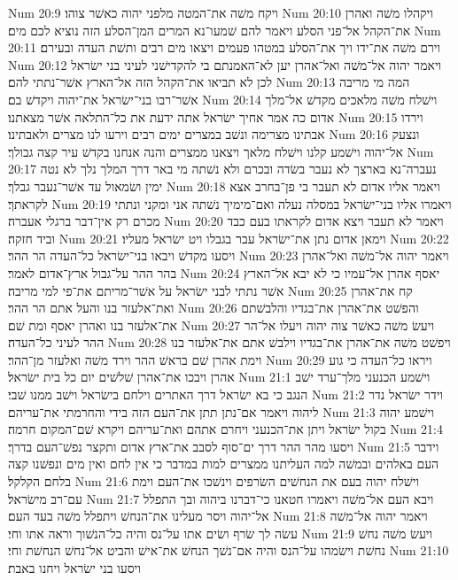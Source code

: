 Num 20:9  ויקח משׁה את־המטה מלפני יהוה כאשׁר צוהו׃
Num 20:10  ויקהלו משׁה ואהרן את־הקהל אל־פני הסלע ויאמר להם שׁמעו־נא המרים המן־הסלע הזה נוציא לכם מים׃
Num 20:11  וירם משׁה את־ידו ויך את־הסלע במטהו פעמים ויצאו מים רבים ותשׁת העדה ובעירם׃
Num 20:12  ויאמר יהוה אל־משׁה ואל־אהרן יען לא־האמנתם בי להקדישׁני לעיני בני ישׂראל לכן לא תביאו את־הקהל הזה אל־הארץ אשׁר־נתתי להם׃
Num 20:13  המה מי מריבה אשׁר־רבו בני־ישׂראל את־יהוה ויקדשׁ בם׃
Num 20:14  וישׁלח משׁה מלאכים מקדשׁ אל־מלך אדום כה אמר אחיך ישׂראל אתה ידעת את כל־התלאה אשׁר מצאתנו׃
Num 20:15  וירדו אבתינו מצרימה ונשׁב במצרים ימים רבים וירעו לנו מצרים ולאבתינו׃
Num 20:16  ונצעק אל־יהוה וישׁמע קלנו וישׁלח מלאך ויצאנו ממצרים והנה אנחנו בקדשׁ עיר קצה גבולך׃
Num 20:17  נעברה־נא בארצך לא נעבר בשׂדה ובכרם ולא נשׁתה מי באר דרך המלך נלך לא נטה ימין ושׂמאול עד אשׁר־נעבר גבלך׃
Num 20:18  ויאמר אליו אדום לא תעבר בי פן־בחרב אצא לקראתך׃
Num 20:19  ויאמרו אליו בני־ישׂראל במסלה נעלה ואם־מימיך נשׁתה אני ומקני ונתתי מכרם רק אין־דבר ברגלי אעברה׃
Num 20:20  ויאמר לא תעבר ויצא אדום לקראתו בעם כבד וביד חזקה׃
Num 20:21  וימאן אדום נתן את־ישׂראל עבר בגבלו ויט ישׂראל מעליו׃
Num 20:22  ויסעו מקדשׁ ויבאו בני־ישׂראל כל־העדה הר ההר׃
Num 20:23  ויאמר יהוה אל־משׁה ואל־אהרן בהר ההר על־גבול ארץ־אדום לאמר׃
Num 20:24  יאסף אהרן אל־עמיו כי לא יבא אל־הארץ אשׁר נתתי לבני ישׂראל על אשׁר־מריתם את־פי למי מריבה׃
Num 20:25  קח את־אהרן ואת־אלעזר בנו והעל אתם הר ההר׃
Num 20:26  והפשׁט את־אהרן את־בגדיו והלבשׁתם את־אלעזר בנו ואהרן יאסף ומת שׁם׃
Num 20:27  ויעשׂ משׁה כאשׁר צוה יהוה ויעלו אל־הר ההר לעיני כל־העדה׃
Num 20:28  ויפשׁט משׁה את־אהרן את־בגדיו וילבשׁ אתם את־אלעזר בנו וימת אהרן שׁם בראשׁ ההר וירד משׁה ואלעזר מן־ההר׃
Num 20:29  ויראו כל־העדה כי גוע אהרן ויבכו את־אהרן שׁלשׁים יום כל בית ישׂראל׃
Num 21:1  וישׁמע הכנעני מלך־ערד ישׁב הנגב כי בא ישׂראל דרך האתרים וילחם בישׂראל וישׁב ממנו שׁבי׃
Num 21:2  וידר ישׂראל נדר ליהוה ויאמר אם־נתן תתן את־העם הזה בידי והחרמתי את־עריהם׃
Num 21:3  וישׁמע יהוה בקול ישׂראל ויתן את־הכנעני ויחרם אתהם ואת־עריהם ויקרא שׁם־המקום חרמה׃
Num 21:4  ויסעו מהר ההר דרך ים־סוף לסבב את־ארץ אדום ותקצר נפשׁ־העם בדרך׃
Num 21:5  וידבר העם באלהים ובמשׁה למה העליתנו ממצרים למות במדבר כי אין לחם ואין מים ונפשׁנו קצה בלחם הקלקל׃
Num 21:6  וישׁלח יהוה בעם את הנחשׁים השׂרפים וינשׁכו את־העם וימת עם־רב מישׂראל׃
Num 21:7  ויבא העם אל־משׁה ויאמרו חטאנו כי־דברנו ביהוה ובך התפלל אל־יהוה ויסר מעלינו את־הנחשׁ ויתפלל משׁה בעד העם׃
Num 21:8  ויאמר יהוה אל־משׁה עשׂה לך שׂרף ושׂים אתו על־נס והיה כל־הנשׁוך וראה אתו וחי׃
Num 21:9  ויעשׂ משׁה נחשׁ נחשׁת וישׂמהו על־הנס והיה אם־נשׁך הנחשׁ את־אישׁ והביט אל־נחשׁ הנחשׁת וחי׃
Num 21:10  ויסעו בני ישׂראל ויחנו באבת׃
